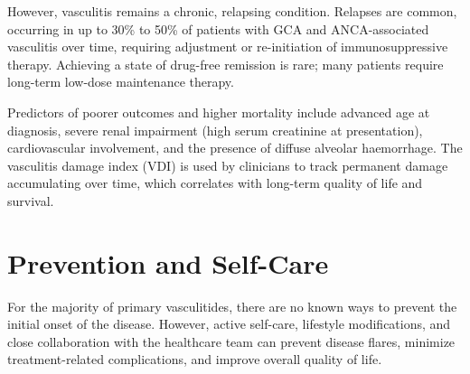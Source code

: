 However, vasculitis remains a chronic, relapsing condition. Relapses are common, occurring in up to 30\% to 50\% of patients with GCA and ANCA-associated vasculitis over time, requiring adjustment or re-initiation of immunosuppressive therapy. Achieving a state of drug-free remission is rare; many patients require long-term low-dose maintenance therapy.

Predictors of poorer outcomes and higher mortality include advanced age at diagnosis, severe renal impairment (high serum creatinine at presentation), cardiovascular involvement, and the presence of diffuse alveolar haemorrhage. The vasculitis damage index (VDI) is used by clinicians to track permanent damage accumulating over time, which correlates with long-term quality of life and survival.

\section*{Prevention and Self-Care}
For the majority of primary vasculitides, there are no known ways to prevent the initial onset of the disease. However, active self-care, lifestyle modifications, and close collaboration with the healthcare team can prevent disease flares, minimize treatment-related complications, and improve overall quality of life.

